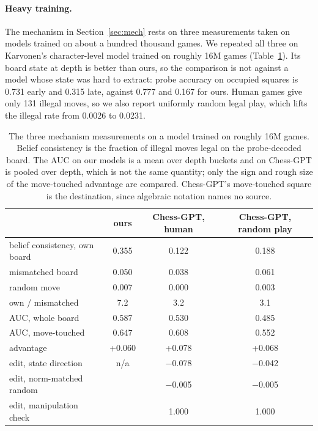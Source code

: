 \documentclass[11pt]{article}
\begin{document}
\paragraph{Heavy training.}
The mechanism in Section~\ref{sec:mech} rests on three measurements taken on
models trained on about a hundred thousand games. We repeated all three on
Karvonen's character-level model trained on roughly 16M games
(Table~\ref{tab:chessgpt}). Its board state at depth is better than ours, so the
comparison is not against a model whose state was hard to extract: probe accuracy
on occupied squares is 0.731 early and 0.315 late,
against 0.777 and 0.167 for ours. Human games give
only 131 illegal moves, so we also report uniformly random legal play,
which lifts the illegal rate from 0.0026 to 0.0231.

\begin{table}[t]
\centering\small
\caption{The three mechanism measurements on a model trained on roughly 16M games.
Belief consistency is the fraction of illegal moves legal on the probe-decoded
board. The AUC on our models is a mean over depth buckets and on Chess-GPT is
pooled over depth, which is not the same quantity; only the sign and rough size of
the move-touched advantage are compared. Chess-GPT's move-touched square is the
destination, since algebraic notation names no source.}
\label{tab:chessgpt}
\begin{tabular}{lccc}
\toprule
& ours & Chess-GPT, human & Chess-GPT, random play \\
\midrule
belief consistency, own board & 0.355 & 0.122 & 0.188 \\
\quad mismatched board        & 0.050 & 0.038 & 0.061 \\
\quad random move             & 0.007 & 0.000 & 0.003 \\
\quad own / mismatched        & 7.2 & 3.2 & 3.1 \\
\midrule
AUC, whole board              & 0.587 & 0.530 & 0.485 \\
AUC, move-touched             & 0.647 & 0.608 & 0.552 \\
\quad advantage               & +0.060 & +0.078 & +0.068 \\
\midrule
edit, state direction         & n/a & $-$0.078 & $-$0.042 \\
edit, norm-matched random     & & $-$0.005 & $-$0.005 \\
edit, manipulation check      & & 1.000 & 1.000 \\
\bottomrule
\end{tabular}
\end{table}
\end{document}
